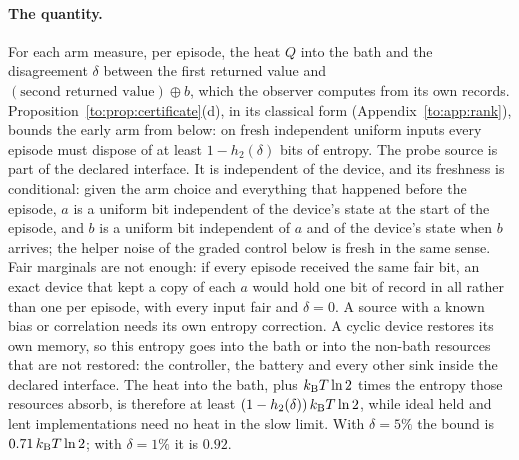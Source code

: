 \paragraph{The quantity.} For each arm measure, per episode, the heat $Q$ into the bath and the disagreement $\delta$ between the first returned value and $(\text{second returned value})\oplus b$, which the observer computes from its own records. Proposition~\ref{to:prop:certificate}(d), in its classical form (Appendix~\ref{to:app:rank}), bounds the early arm from below: on fresh independent uniform inputs every episode must dispose of at least $1-h_2(\delta)$ bits of entropy. The probe source is part of the declared interface. It is independent of the device, and its freshness is conditional: given the arm choice and everything that happened before the episode, $a$ is a uniform bit independent of the device's state at the start of the episode, and $b$ is a uniform bit independent of $a$ and of the device's state when $b$ arrives; the helper noise of the graded control below is fresh in the same sense. Fair marginals are not enough: if every episode received the same fair bit, an exact device that kept a copy of each $a$ would hold one bit of record in all rather than one per episode, with every input fair and $\delta=0$. A source with a known bias or correlation needs its own entropy correction. A cyclic device restores its own memory, so this entropy goes into the bath or into the non-bath resources that are not restored: the controller, the battery and every other sink inside the declared interface. The heat into the bath, plus $k_{\mathrm B} T\ln2$ times the entropy those resources absorb, is therefore at least $(1-h_2(\delta))\,k_{\mathrm B} T\ln2$, while ideal held and lent implementations need no heat in the slow limit. With $\delta=5\%$ the bound is $0.71\,k_{\mathrm B} T\ln2$; with $\delta=1\%$ it is $0.92$.

